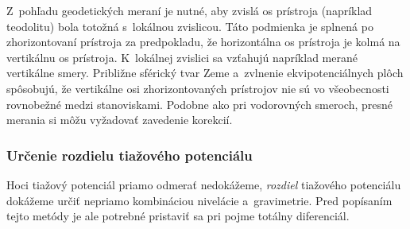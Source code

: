 \documentclass[a4paper, 12pt]{book}
\begin{document}
Z~pohľadu geodetických meraní je nutné, aby zvislá os prístroja (napríklad 
teodolitu) bola totožná s~lokálnou zvislicou.  Táto podmienka je splnená po 
zhorizontovaní prístroja za predpokladu, že horizontálna os prístroja je kolmá 
na vertikálnu os prístroja.  K~lokálnej zvislici sa vzťahujú napríklad merané 
vertikálne smery.  Približne sférický tvar Zeme a~zvlnenie ekvipotenciálnych 
plôch spôsobujú, že vertikálne osi zhorizontovaných prístrojov nie sú vo 
všeobecnosti rovnobežné medzi stanoviskami.  Podobne ako pri vodorovných 
smeroch, presné merania si môžu vyžadovať zavedenie korekcií.

\subsubsection{Určenie rozdielu tiažového potenciálu}
\label{sec:potential_differences}

Hoci tiažový potenciál priamo odmerať nedokážeme, \emph{rozdiel} tiažového 
potenciálu dokážeme určiť nepriamo kombináciou nivelácie a~gravimetrie.  Pred 
popísaním tejto metódy je ale potrebné pristaviť sa pri pojme totálny 
diferenciál.
\end{document}
